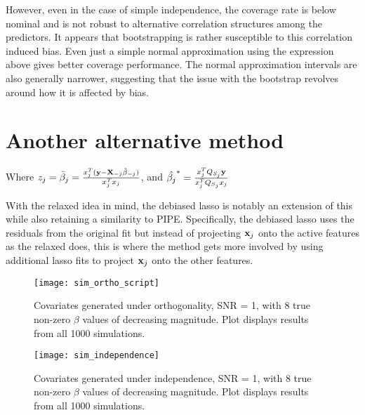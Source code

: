 However, even in the case of simple independence, the coverage rate is below nominal and is not robust to alternative correlation structures among the predictors. It appears that bootstrapping is rather susceptible to this correlation induced bias. Even just a simple normal approximation using the expression above gives better coverage performance. The normal approximation intervals are also generally narrower, suggesting that the issue with the bootstrap revolves around how it is affected by bias.

\section{Another alternative method}


Where $z_j = \bar{\beta}_j = \frac{x_j^T(\mathbf{y} - \mathbf{X}_{-j}\hat{\beta}_{-j})}{x_j^T x_j}$, and $\hat{\beta_j}^* = \frac{x_j^T Q_{S_j} \mathbf{y}}{x_j^T Q_{S_j} x_j}$

With the relaxed idea in mind, the debiased lasso is notably an extension of this while also retaining a similarity to PIPE. Specifically, the debiased lasso uses the residuals from the original fit but instead of projecting $\mathbf{x}_j$ onto the active features as the relaxed does, this is where the method gets more involved by using additional lasso fits to project $\mathbf{x}_j$ onto the other features.

\begin{figure}[hbtp]
    \begin{center}
    \texttt{[image: sim\_ortho\_script]}
    \caption{\label{Fig:sim_ortho} Covariates generated under orthogonality, SNR = 1, with 8 true non-zero $\beta$ values of decreasing magnitude. Plot displays results from all 1000 simulations.}
    \end{center}
\end{figure}

\begin{figure}[hbtp]
    \begin{center}
    \texttt{[image: sim\_independence]}
    \caption{\label{Fig:sim_independence} Covariates generated under independence, SNR = 1, with 8 true non-zero $\beta$ values of decreasing magnitude. Plot displays results from all 1000 simulations.}
    \end{center}
\end{figure}

